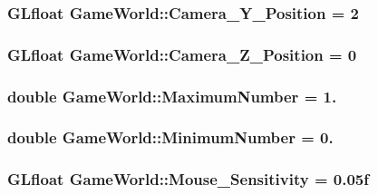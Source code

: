 \subsubsection[{Camera\+\_\+\+Y\+\_\+\+Position}]{\setlength{\rightskip}{0pt plus 5cm}G\+Lfloat Game\+World\+::\+Camera\+\_\+\+Y\+\_\+\+Position = 2}\label{class_game_world_ae3e7cab30494ff5a8e91dfa7406deb16}
\hypertarget{class_game_world_ad993ea24fbacfc98410894078e916927}{}
\subsubsection[{Camera\+\_\+\+Z\+\_\+\+Position}]{\setlength{\rightskip}{0pt plus 5cm}G\+Lfloat Game\+World\+::\+Camera\+\_\+\+Z\+\_\+\+Position = 0}\label{class_game_world_ad993ea24fbacfc98410894078e916927}
\hypertarget{class_game_world_a1cddcf233625a98581eaeb9fd7c8c574}{}
\subsubsection[{Maximum\+Number}]{\setlength{\rightskip}{0pt plus 5cm}double Game\+World\+::\+Maximum\+Number = 1.}\label{class_game_world_a1cddcf233625a98581eaeb9fd7c8c574}
\hypertarget{class_game_world_a54ccf4cf03172ab8779e9c326c8846ed}{}
\subsubsection[{Minimum\+Number}]{\setlength{\rightskip}{0pt plus 5cm}double Game\+World\+::\+Minimum\+Number = 0.}\label{class_game_world_a54ccf4cf03172ab8779e9c326c8846ed}
\hypertarget{class_game_world_a9bf4eb977e6ab9299aaef1345c4fa4dd}{}
\subsubsection[{Mouse\+\_\+\+Sensitivity}]{\setlength{\rightskip}{0pt plus 5cm}G\+Lfloat Game\+World\+::\+Mouse\+\_\+\+Sensitivity = 0.\+05f}\label{class_game_world_a9bf4eb977e6ab9299aaef1345c4fa4dd}


